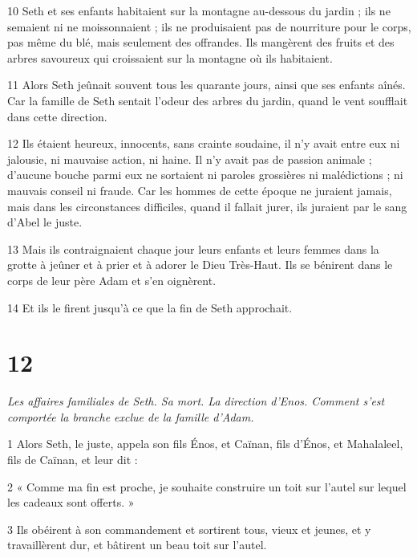 \par 10 Seth et ses enfants habitaient sur la montagne au-dessous du jardin ; ils ne semaient ni ne moissonnaient ; ils ne produisaient pas de nourriture pour le corps, pas même du blé, mais seulement des offrandes. Ils mangèrent des fruits et des arbres savoureux qui croissaient sur la montagne où ils habitaient.

\par 11 Alors Seth jeûnait souvent tous les quarante jours, ainsi que ses enfants aînés. Car la famille de Seth sentait l'odeur des arbres du jardin, quand le vent soufflait dans cette direction.

\par 12 Ils étaient heureux, innocents, sans crainte soudaine, il n'y avait entre eux ni jalousie, ni mauvaise action, ni haine. Il n'y avait pas de passion animale ; d'aucune bouche parmi eux ne sortaient ni paroles grossières ni malédictions ; ni mauvais conseil ni fraude. Car les hommes de cette époque ne juraient jamais, mais dans les circonstances difficiles, quand il fallait jurer, ils juraient par le sang d'Abel le juste.

\par 13 Mais ils contraignaient chaque jour leurs enfants et leurs femmes dans la grotte à jeûner et à prier et à adorer le Dieu Très-Haut. Ils se bénirent dans le corps de leur père Adam et s'en oignèrent.

\par 14 Et ils le firent jusqu'à ce que la fin de Seth approchait.

\chapter{12}

\par \textit{Les affaires familiales de Seth. Sa mort. La direction d'Enos. Comment s'est comportée la branche exclue de la famille d'Adam.}

\par 1 Alors Seth, le juste, appela son fils Énos, et Caïnan, fils d'Énos, et Mahalaleel, fils de Caïnan, et leur dit :

\par 2 « Comme ma fin est proche, je souhaite construire un toit sur l'autel sur lequel les cadeaux sont offerts. »

\par 3 Ils obéirent à son commandement et sortirent tous, vieux et jeunes, et y travaillèrent dur, et bâtirent un beau toit sur l'autel.

